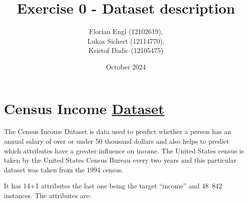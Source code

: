 \documentclass{scrartcl}[a4paper, 11pt]
\title{Exercise 0 - Dataset description}
\author{Florian Engl (12102619),\\ Lukas Sichert (12114770),\\ Kristof Dadic (12105475)}
\date{October 2024}
\begin{document}
\maketitle

\section{Census Income \href{https://archive.ics.uci.edu/dataset/2/adult}{Dataset}}
    The Census Income Dataset is data used to predict whether a person has an annual salary of over or under 50 thousand dollars and also helps to predict which attributes have a greater influence on income. The United States census is taken by the United States Census Bureau every two years and this particular dataset was taken from the 1994 census.
    \vspace{4mm}
    
    It has 14+1 attributes the last one being the target \enquote{income} and 48~842 instances. The attributes are:
\end{document}
